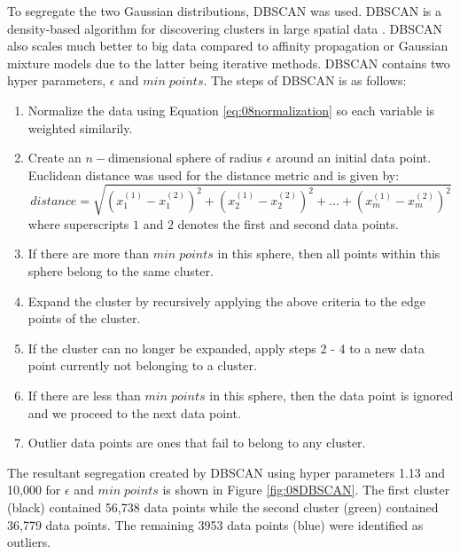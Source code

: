 To segregate the two Gaussian distributions, DBSCAN was used.  DBSCAN is a density-based algorithm for discovering clusters in large spatial data \cite{DBSCAN}. DBSCAN also scales much better to big data compared to affinity propagation or Gaussian mixture models due to the latter being iterative methods.
DBSCAN contains two hyper parameters, $\epsilon$ and $min \; points$.  The steps of DBSCAN is as follows:
\begin{enumerate}
    \item Normalize the data using Equation \ref{eq:08normalization} so each variable is weighted similarily.
    \item Create an $n-$dimensional sphere of radius $\epsilon$ around an initial data point.  Euclidean distance was used for the distance metric and is given by:
    \begin{equation}
        distance = \sqrt{(x_1^{(1)} - x_1^{(2)})^2 + (x_2^{(1)} - x_2^{(2)})^2 + ... + (x_m^{(1)} - x_m^{(2)})^2}
    \end{equation}
    where superscripts $1$ and $2$ denotes the first and second data points.
    \item If there are more than $min \; points$ in this sphere, then all points within this sphere belong to the same cluster.
    \item Expand the cluster by recursively applying the above criteria to the edge points of the cluster.
    \item If the cluster can no longer be expanded, apply steps 2 - 4 to a new data point currently not belonging to a cluster.
    \item If there are less than $min \; points$ in this sphere, then the data point is ignored and we proceed to the next data point.
    \item Outlier data points are ones that fail to belong to any cluster.
\end{enumerate}
The resultant segregation created by DBSCAN using hyper parameters 1.13 and 10,000 for $\epsilon$ and $min \; points$ is shown in Figure \ref{fig:08DBSCAN}. The first cluster (black) contained 56,738 data points while the second cluster (green) contained 36,779 data points.  The remaining 3953 data points (blue) were identified as outliers.
